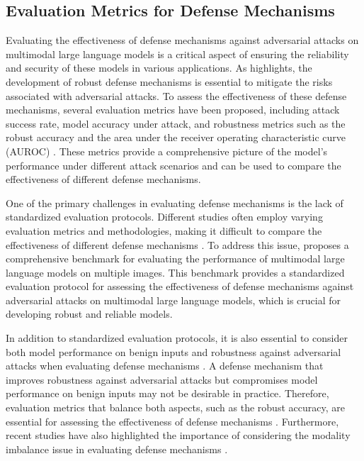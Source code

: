 \documentclass[11pt,a4paper]{article}
\begin{document}
\subsection{Evaluation Metrics for Defense Mechanisms}


Evaluating the effectiveness of defense mechanisms against adversarial attacks on multimodal large language models is a critical aspect of ensuring the reliability and security of these models in various applications. As \cite{arxiv:2401.13601} highlights, the development of robust defense mechanisms is essential to mitigate the risks associated with adversarial attacks. To assess the effectiveness of these defense mechanisms, several evaluation metrics have been proposed, including attack success rate, model accuracy under attack, and robustness metrics such as the robust accuracy and the area under the receiver operating characteristic curve (AUROC) \cite{arxiv:2408.08632}. These metrics provide a comprehensive picture of the model's performance under different attack scenarios and can be used to compare the effectiveness of different defense mechanisms.

One of the primary challenges in evaluating defense mechanisms is the lack of standardized evaluation protocols. Different studies often employ varying evaluation metrics and methodologies, making it difficult to compare the effectiveness of different defense mechanisms \cite{arxiv:2408.15769}. To address this issue, \cite{arxiv:2407.15272} proposes a comprehensive benchmark for evaluating the performance of multimodal large language models on multiple images. This benchmark provides a standardized evaluation protocol for assessing the effectiveness of defense mechanisms against adversarial attacks on multimodal large language models, which is crucial for developing robust and reliable models.

In addition to standardized evaluation protocols, it is also essential to consider both model performance on benign inputs and robustness against adversarial attacks when evaluating defense mechanisms \cite{arxiv:2401.02906}. A defense mechanism that improves robustness against adversarial attacks but compromises model performance on benign inputs may not be desirable in practice. Therefore, evaluation metrics that balance both aspects, such as the robust accuracy, are essential for assessing the effectiveness of defense mechanisms \cite{arxiv:2410.07167}. Furthermore, recent studies have also highlighted the importance of considering the modality imbalance issue in evaluating defense mechanisms \cite{arxiv:2508.10552}.
\end{document}
